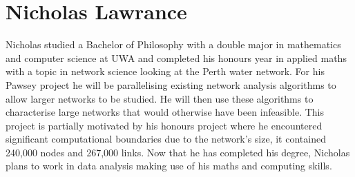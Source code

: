 \section{Nicholas Lawrance}

Nicholas studied a Bachelor of Philosophy with a double major in mathematics and computer science at UWA and completed his honours year in applied maths with a topic in network science looking at the Perth water network. For his Pawsey project he will be parallelising existing network analysis algorithms to allow larger networks to be studied. He will then use these algorithms to characterise large networks that would otherwise have been infeasible. This project is partially motivated by his honours project where he encountered significant computational boundaries due to the network's size, it contained 240,000 nodes and 267,000 links. Now that he has completed his degree, Nicholas plans to work in data analysis making use of his maths and computing skills. 

